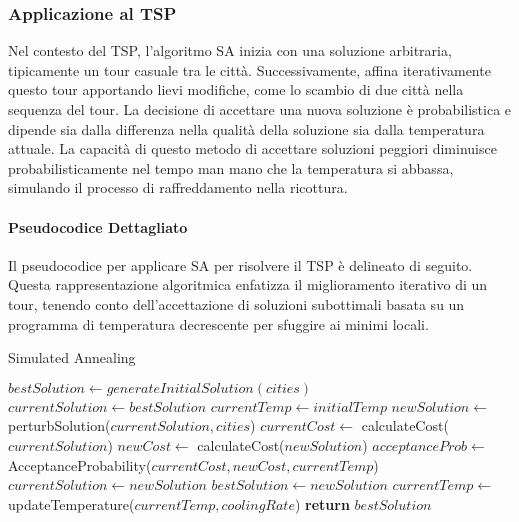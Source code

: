 \subsubsection{Applicazione al \gls{TSP}}

Nel contesto del \gls{TSP}, l'algoritmo SA inizia con una soluzione arbitraria, tipicamente un tour casuale tra le città. Successivamente, affina iterativamente questo tour apportando lievi modifiche, come lo scambio di due città nella sequenza del tour. La decisione di accettare una nuova soluzione è probabilistica e dipende sia dalla differenza nella qualità della soluzione sia dalla temperatura attuale. La capacità di questo metodo di accettare soluzioni peggiori diminuisce probabilisticamente nel tempo man mano che la temperatura si abbassa, simulando il processo di raffreddamento nella ricottura.

\paragraph{Pseudocodice Dettagliato}

Il pseudocodice per applicare \gls{SA} per risolvere il \gls{TSP} è delineato di seguito. Questa rappresentazione algoritmica enfatizza il miglioramento iterativo di un tour, tenendo conto dell'accettazione di soluzioni subottimali basata su un programma di temperatura decrescente per sfuggire ai minimi locali.

\begin{algorithm}
	\caption{Simulated Annealing}\label{alg:detailedsimulatedannealing}
	\begin{algorithmic}[1]
		\State $bestSolution \gets generateInitialSolution(cities)$
		\State $currentSolution \gets bestSolution$
		\State $currentTemp \gets initialTemp$
		\State $newSolution \gets$ perturbSolution($currentSolution, cities$)
		\State $currentCost \gets$ calculateCost($currentSolution$)
		\State $newCost \gets$ calculateCost($newSolution$)
		\State $acceptanceProb \gets$ AcceptanceProbability($currentCost, newCost, currentTemp$)
		\State $currentSolution \gets newSolution$
		\State $bestSolution \gets newSolution$
		\EndIf
		\EndIf
		\State $currentTemp \gets$ updateTemperature($currentTemp, coolingRate$)
		\EndWhile
		\State \textbf{return} $bestSolution$
		\EndProcedure
	\end{algorithmic}
\end{algorithm}

